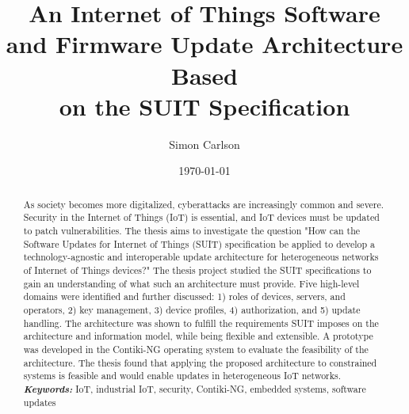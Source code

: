 \documentclass{kththesis}
\title{An Internet of Things Software and Firmware Update Architecture Based\\on the SUIT Specification}
\author{Simon Carlson}
\date{\today}
\providecommand{\keywords}[1]{\textbf{\textit{Keywords:}} #1}
\begin{document}

\frontmatter

\titlepage

\begin{abstract}
As society becomes more digitalized, cyberattacks are increasingly common and severe.
Security in the Internet of Things (IoT) is essential, and IoT devices must be updated to
patch vulnerabilities. The thesis aims to investigate the question "How can the Software
Updates for Internet of Things (SUIT) specification be applied to develop a
technology-agnostic and interoperable update architecture for heterogeneous networks of
Internet of Things devices?" The thesis project studied the SUIT specifications to gain an
understanding of what such an architecture must provide. Five high-level domains were
identified and further discussed: 1) roles of devices, servers, and operators, 2) key
management, 3) device profiles, 4) authorization, and 5) update handling. The architecture
was shown to fulfill the requirements SUIT imposes on the architecture and information
model, while being flexible and extensible. A prototype was developed in the Contiki-NG
operating system to evaluate the feasibility of the architecture. The thesis found that
applying the proposed architecture to constrained systems is feasible and would enable
updates in heterogeneous IoT networks.\\

\noindent\keywords{IoT, industrial IoT, security, Contiki-NG, embedded systems, 
                    software updates}
\end{abstract}
\end{document}

